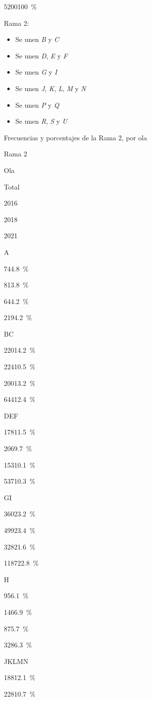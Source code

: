 \documentclass[
  12pt,
]{book}
\providecommand{\tightlist}{%
  \setlength{\itemsep}{0pt}\setlength{\parskip}{0pt}}
\begin{document}
{5200}{100~\%}

Rama 2:

\begin{itemize}
\tightlist
\item
  Se unen \emph{B} y \emph{C}
\item
  Se unen \emph{D}, \emph{E} y \emph{F}
\item
  Se unen \emph{G} y \emph{I}
\item
  Se unen \emph{J}, \emph{K}, \emph{L}, \emph{M} y \emph{N}
\item
  Se unen \emph{P} y \emph{Q}
\item
  Se unen \emph{R}, \emph{S} y \emph{U}
\end{itemize}

Frecuencias y porcentajes de la Rama 2, por ola

Rama 2

Ola

Total

2016

2018

2021

A

{74}{4.8~\%}

{81}{3.8~\%}

{64}{4.2~\%}

{219}{4.2~\%}

BC

{220}{14.2~\%}

{224}{10.5~\%}

{200}{13.2~\%}

{644}{12.4~\%}

DEF

{178}{11.5~\%}

{206}{9.7~\%}

{153}{10.1~\%}

{537}{10.3~\%}

GI

{360}{23.2~\%}

{499}{23.4~\%}

{328}{21.6~\%}

{1187}{22.8~\%}

H

{95}{6.1~\%}

{146}{6.9~\%}

{87}{5.7~\%}

{328}{6.3~\%}

JKLMN

{188}{12.1~\%}

{228}{10.7~\%}
\end{document}

